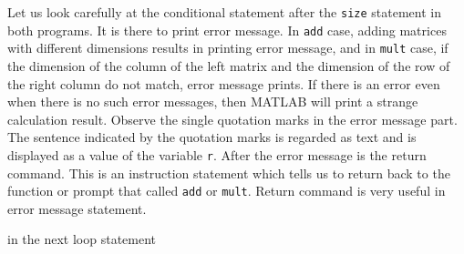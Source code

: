 \begin{center}
\end{center} \vn  Let us look carefully at the conditional statement after the {\tt size} statement in both programs. It is there to print error message. In {\tt add} case, adding matrices with different dimensions results in printing error message, and in {\tt mult} case, if the dimension of the column of the left matrix and the dimension of the row of the right column do not match, error message prints. If there is an error even when there is no such error messages, then MATLAB will print a strange calculation result. Observe the single quotation marks in the error message part. The sentence indicated by the quotation marks is regarded as text and is displayed as a value of the variable {\tt r}. After the error message is the return command. This is an instruction statement which tells us to return back to the function or prompt that called {\tt add} or {\tt mult}. Return command is very useful in error message statement.

 in the next loop statement


